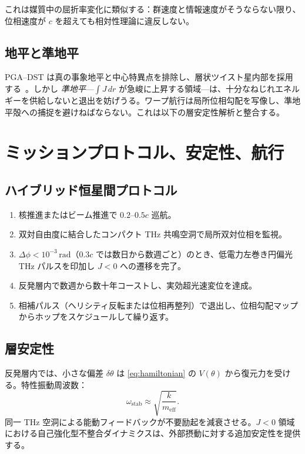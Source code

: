 \documentclass[dvipdfmx,a4paper]{article}
\theoremstyle{definition}
\begin{document}
これは媒質中の屈折率変化に類似する：群速度と情報速度がそうならない限り、位相速度が $c$ を超えても相対性理論に違反しない。

\subsection{地平と準地平}

PGA--DST は真の事象地平と中心特異点を排除し、層状ツイスト星内部を採用する~\cite{dual2025}。しかし \emph{準地平}---$\int J\,dr$ が急峻に上昇する領域---は、十分なねじれエネルギーを供給しないと退出を妨げうる。ワープ航行は局所位相勾配を写像し、準地平殻への捕捉を避けねばならない。これは以下の層安定性解析と整合する。

\section{ミッションプロトコル、安定性、航行}
\label{sec:mission}

\subsection{ハイブリッド恒星間プロトコル}

\begin{enumerate}[leftmargin=2em]
  \item 核推進またはビーム推進で $0.2$--$0.5c$ 巡航。
  \item 双対自由度に結合したコンパクト THz 共鳴空洞で局所双対位相を監視。
  \item $\Delta\phi<10^{-3}\,\mathrm{rad}$（$0.3c$ では数日から数週ごと）のとき、低電力左巻き円偏光 THz パルスを印加し $J<0$ への遷移を完了。
  \item 反発層内で数週から数十年コーストし、実効超光速変位を達成。
  \item 相補パルス（ヘリシティ反転または位相再整列）で退出し、位相勾配マップからホップをスケジュールして繰り返す。
\end{enumerate}

\subsection{層安定性}

反発層内では、小さな偏差 $\delta\theta$ は \eqref{eq:hamiltonian} の $V(\theta)$ から復元力を受ける。特性振動周波数：
\begin{equation}
\omega_{\mathrm{stab}} \approx \sqrt{\frac{k}{m_{\mathrm{eff}}}}.
\end{equation}
同一 THz 空洞による能動フィードバックが不要励起を減衰させる。$J<0$ 領域における自己強化型不整合ダイナミクスは、外部摂動に対する追加安定性を提供する。
\end{document}
